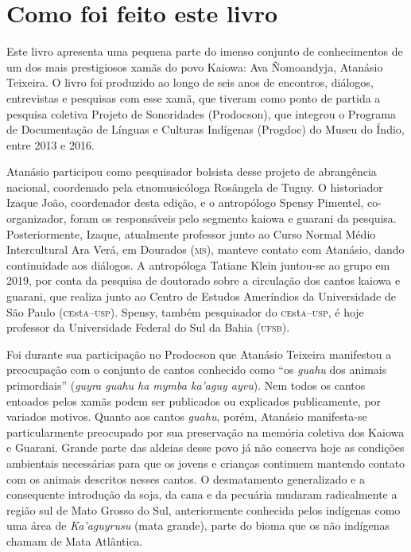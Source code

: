 \chapter{Como foi feito este livro}

Este livro apresenta uma pequena parte do imenso conjunto de
conhecimentos de um dos mais prestigiosos xamãs do povo Kaiowa: Ava
Ñomoandyja, Atanásio Teixeira. O livro foi produzido ao longo de seis
anos de encontros, diálogos, entrevistas e pesquisas com esse xamã, que
tiveram como ponto de partida a pesquisa coletiva Projeto de Sonoridades
(Prodocson), que integrou o Programa de Documentação de Línguas e
Culturas Indígenas (Progdoc) do Museu do Índio, entre 2013 e 2016.

Atanásio participou como pesquisador bolsista desse projeto de
abrangência nacional, coordenado pela etnomusicóloga Rosângela de Tugny.
O historiador Izaque João, coordenador desta edição, e o antropólogo
Spensy Pimentel, co-organizador, foram os responsáveis pelo segmento
kaiowa e guarani da pesquisa. Posteriormente, Izaque, atualmente
professor junto ao Curso Normal Médio Intercultural Ara Verá, em
Dourados (\textsc{ms}), manteve contato com Atanásio, dando continuidade aos
diálogos. A antropóloga Tatiane Klein juntou-se ao grupo em 2019, por
conta da pesquisa de doutorado sobre a circulação dos cantos kaiowa e
guarani, que realiza junto ao Centro de Estudos Ameríndios da
Universidade de São Paulo (\textsc{ce}st\textsc{a}--\textsc{usp}). Spensy, também pesquisador do
\textsc{ce}st\textsc{a}--\textsc{usp}, é hoje professor da Universidade Federal do Sul da Bahia
(\textsc{ufsb}).

Foi durante sua participação no Prodocson que Atanásio Teixeira
manifestou a preocupação com o conjunto de cantos conhecido como ``os
\emph{guahu} dos animais primordiais'' (\emph{guyra guahu ha
mymba ka'aguy ayvu}). Nem todos os cantos entoados pelos xamãs podem ser
publicados ou explicados publicamente, por variados motivos. Quanto aos
cantos \emph{guahu}, porém, Atanásio manifesta-se particularmente
preocupado por sua preservação na memória coletiva dos Kaiowa e Guarani.
Grande parte das aldeias desse povo já não conserva hoje as condições
ambientais necessárias para que os jovens e crianças continuem mantendo
contato com os animais descritos nesses cantos. O desmatamento
generalizado e a consequente introdução da soja, da cana e da pecuária
mudaram radicalmente a região sul de Mato Grosso do Sul, anteriormente
conhecida pelos indígenas como uma área de \emph{Ka'aguyrusu} (mata
grande), parte do bioma que os não indígenas chamam de Mata Atlântica.

